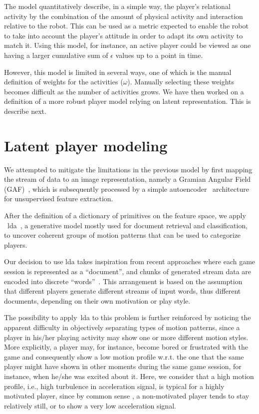 The model quantitatively describe, in a simple way, the player's relational activity by the combination of the amount of physical activity and interaction relative to the robot. This can be used as a metric expected to enable the robot to take into account the player's attitude in order to adapt its own activity to match it. Using this model, for instance, an active player could be viewed as one having a larger cumulative sum of $\epsilon$ values up to a point in time.

However, this model is limited in several ways, %
one of which is the manual definition of weights for the activities ($\omega$). Manually selecting these weights becomes difficult as the number of activities grows. We have then worked on a definition of a more robust player model relying on latent representation. This is describe next.

\section{Latent player modeling}

We attempted to mitigate the limitations in the previous model by first mapping the stream of data to an image representation, namely a Gramian Angular Field (GAF)~\citep{wang_imaging_2015}, which is subsequently processed by a simple autoencoder~\citep{goodfellow_deep_2016} architecture for unsupervised feature extraction. %

After the definition of a dictionary of primitives on the feature space, we apply ~\gls{lda}~\citep{blei_latent_2003}, a generative model mostly used for document retrieval and classification, to uncover coherent groups of motion patterns that can be used to categorize players.

Our decision to use \gls{lda} takes inspiration from recent approaches where each game session is represented as a ``document'', and chunks of generated stream data are encoded into discrete ``words''~\citep{smith_mining_2016}. This arrangement is based on the assumption that different players generate different streams of input words, thus different documents, depending on their own motivation or play style. 

The possibility to apply~\gls{lda} to this problem is further reinforced by noticing the apparent difficulty in objectively separating types of motion patterns, since a player in his/her playing activity may show one or more different motion styles. More explicitly, a player may, for instance, become bored or frustrated with the game and consequently show a low motion profile w.r.t. the one that the same player might have shown in other moments during the same game session, for instance, when he/she was excited about it. Here, we consider that a high motion profile, i.e., high turbulence in acceleration signal, is typical for a highly motivated player, since by common sense %
, a non-motivated player {tends} to stay relatively still, or to show a very low acceleration signal.

